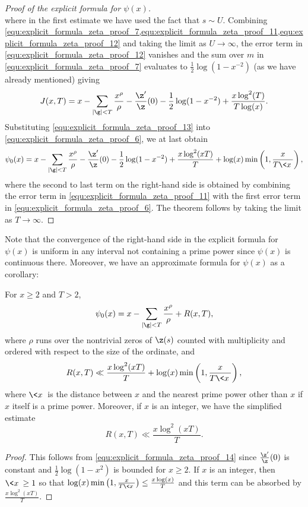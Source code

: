 \begin{proof}[Proof of the explicit formula for $\psi(x)$]
\begin{equation}
        \end{equation}
        where in the first estimate we have used the fact that $s \sim U$. Combining \cref{equ:explicit_formula_zeta_proof_7,equ:explicit_formula_zeta_proof_11,equ:explicit_formula_zeta_proof_12} and taking the limit as $U \to \infty$, the error term in \cref{equ:explicit_formula_zeta_proof_12} vanishes and the sum over $m$ in \cref{equ:explicit_formula_zeta_proof_7} evaluates to $\frac{1}{2}\log(1-x^{-2})$ (as we have already mentioned) giving
        \begin{equation}\label{equ:explicit_formula_zeta_proof_13}
          J(x,T) = x-\sum_{|\g| < T}\frac{x^{\rho}}{\rho}-\frac{\z'}{\z}(0)-\frac{1}{2}\log(1-x^{-2})+\frac{x\log^{2}(T)}{T\log(x)}.
        \end{equation}
        Substituting \cref{equ:explicit_formula_zeta_proof_13} into \cref{equ:explicit_formula_zeta_proof_6}, we at last obtain
        \begin{equation}\label{equ:explicit_formula_zeta_proof_14}
          \psi_{0}(x) = x-\sum_{|\g| < T}\frac{x^{\rho}}{\rho}-\frac{\z'}{\z}(0)-\frac{1}{2}\log(1-x^{-2})+\frac{x\log^{2}(xT)}{T}+\log(x)\min\left(1,\frac{x}{T\<x\>}\right),
        \end{equation}
        where the second to last term on the right-hand side is obtained by combining the error term in \cref{equ:explicit_formula_zeta_proof_11} with the first error term in \cref{equ:explicit_formula_zeta_proof_6}. The theorem follows by taking the limit as $T \to \infty$.
      \end{proof}

      Note that the convergence of the right-hand side in the explicit formula for $\psi(x)$ is uniform in any interval not containing a prime power since $\psi(x)$ is continuous there. Moreover, we have an approximate formula for $\psi(x)$ as a corollary:

      \begin{corollary}\label{cor:explicit_formula_zeta_corollary}
         For $x \ge 2$ and $T > 2$,
        \[
           \psi_{0}(x) = x-\sum_{|\g| < T}\frac{x^{\rho}}{\rho}+R(x,T),
        \]
        where $\rho$ runs over the nontrivial zeros of $\z(s)$ counted with multiplicity and ordered with respect to the size of the ordinate, and
        \[
          R(x,T) \ll \frac{x\log^{2}(xT)}{T}+\log(x)\min\left(1,\frac{x}{T\<x\>}\right),
        \]
        where $\<x\>$ is the distance between $x$ and the nearest prime power other than $x$ if $x$ itself is a prime power. Moreover, if $x$ is an integer, we have the simplified estimate
        \[
          R(x,T) \ll \frac{x\log^{2}(xT)}{T}.
        \]
      \end{corollary}
      \begin{proof}
        This follows from \cref{equ:explicit_formula_zeta_proof_14} since $\frac{\z'}{\z}(0)$ is constant and $\frac{1}{2}\log(1-x^{2})$ is bounded for $x \ge 2$. If $x$ is an integer, then $\<x\> \ge 1$ so that $\log(x)\min\left(1,\frac{x}{T\<x\>}\right) \le \frac{x\log(x)}{T}$ and this term can be absorbed by $\frac{x\log^{2}(xT)}{T}$.
      \end{proof}
